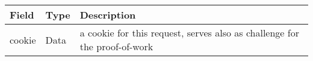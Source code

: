 \begin{tabularx}{.85\linewidth}{llX}
	\toprule
	Field & Type & Description
	\\
	\midrule
	cookie & Data & a cookie for this request, serves also as challenge for the proof-of-work
	\\
	\bottomrule
\end{tabularx}
